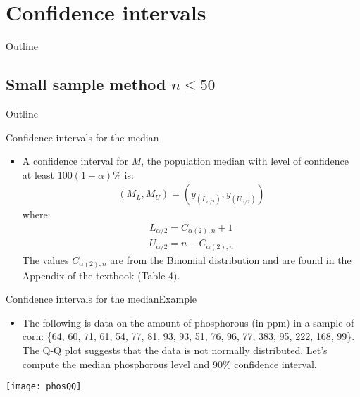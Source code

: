 \documentclass[xcolor=dvipsnames]{beamer}
\begin{document}
\section{Confidence intervals}
\begin{frame}{Outline}
\tableofcontents[currentsection,subsectionstyle=show/shaded/hide]
\end{frame}

\subsection{Small sample method $n \leq 50$}
\begin{frame}{Outline}
\tableofcontents[currentsection,subsectionstyle=show/shaded/hide]
\end{frame}

\begin{frame}{Confidence intervals for the median}
	\begin{itemize}
		\item A confidence interval for $M$, the population median with level of confidence at least $100(1-\alpha)$\% is:
		\begin{gather*}
		(M_L, M_U) = (y_{(L_{\alpha / 2})}, y_{(U_{\alpha/2})})
		\end{gather*} 
		where:
		\begin{gather*}
			L_{\alpha / 2} = C_{\alpha(2), n} + 1 \\
			U_{\alpha / 2} = n - C_{\alpha(2), n}
		\end{gather*}
		The values $C_{\alpha(2),n}$ are from the Binomial distribution and are found in the Appendix of the textbook (Table 4).
	\end{itemize}
\end{frame}

\begin{frame}{Confidence intervals for the median}{Example}
	\begin{itemize}
		\item The following is data on the amount of phosphorous (in ppm) in a sample of corn: \{64,  60, 71, 61, 54, 77, 81, 93, 93, 51, 76, 96, 77, 383, 95, 222, 168, 99\}. The Q-Q plot suggests that the data is not normally distributed. Let's compute the median phosphorous level and 90\% confidence interval.
	\end{itemize}
\vspace{-10pt}
\begin{center}
	\texttt{[image: phosQQ]}
\end{center}
\end{frame}
\end{document}
